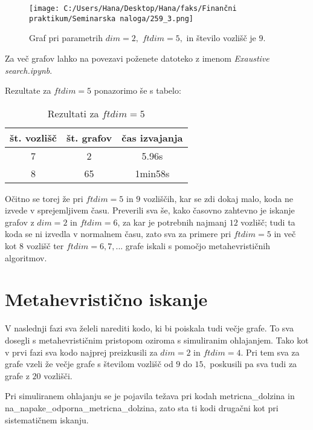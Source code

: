 \documentclass[12pt]{article}
\begin{document}
\begin{figure}[H]
    \centering
    \texttt{[image: C:/Users/Hana/Desktop/Hana/faks/Finančni praktikum/Seminarska naloga/259\_3.png]}
    \caption{Graf pri parametrih $dim = 2,$ $ftdim = 5,$ in število vozlišč je $9.$}
    \label{fig:slika259_3}
\end{figure}

Za več grafov lahko na povezavi poženete datoteko z imenom \textit{Exaustive search.ipynb}.

Rezultate za $ftdim = 5$ ponazorimo še s tabelo:

\begin{table}[H]
	\centering 
 	\begin{tabular}{|c|c|c|} 
 		\hline 
 		\textbf{št. vozlišč} & \textbf{št. grafov} & \textbf{čas izvajanja} \\
 		\hline 7 & 2 & 5.96s  \\ 
 		\hline 8 & 65 & 1min58s \\
 		\hline 
 	\end{tabular} 
 	\caption{Rezultati za $ftdim = 5$}
 	\label{tab:osebe}
\end{table}

Očitno se torej že pri $ftdim = 5$ in $9$ vozliščih, kar se zdi dokaj malo, koda ne izvede v sprejemljivem času. Preverili 
sva še, kako časovno zahtevno je iskanje grafov z $dim = 2$ in $ftdim = 6$, za kar je potrebnih najmanj $12$ vozlišč; tudi 
ta koda se ni izvedla v normalnem času, zato sva za primere pri $ftdim = 5$ in več kot $8$ vozlišč ter $ftdim = 6, 7, ...$ 
grafe iskali s pomočjo metahevrističnih algoritmov. 


\section{Metahevristično iskanje}

V naslednji fazi sva želeli narediti kodo, ki bi poiskala tudi večje grafe. To sva dosegli s metahevrističnim pristopom
oziroma s simuliranim ohlajanjem. Tako kot v prvi fazi sva kodo najprej preizkusili za $dim = 2$ in $ftdim = 4.$ Pri tem 
sva za grafe vzeli že večje grafe s številom vozlišč od $9$ do $15,$ poskusili pa sva tudi za grafe z $20$ vozlišči.
 
Pri simuliranem ohlajanju se je pojavila težava pri kodah metricna\_dolzina in \\ na\_napake\_odporna\_metricna\_dolzina, zato 
sta ti kodi drugačni kot pri sistematičnem iskanju. 
\end{document}

